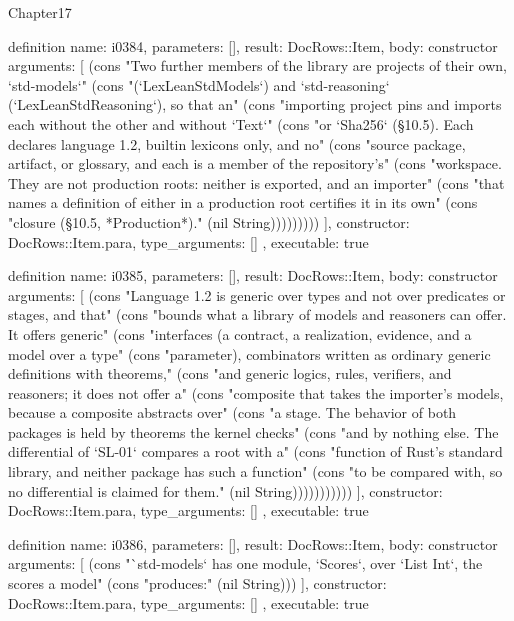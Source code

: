 \begin{lexlean}{Chapter17}
\begin{semanticmodule}
definition{
  name: i0384,
  parameters: [],
  result: DocRows::Item,
  body: constructor{
    arguments: [
      (cons "Two further members of the library are projects of their own, `std-models`" (cons "(`LexLeanStdModels`) and `std-reasoning` (`LexLeanStdReasoning`), so that an" (cons "importing project pins and imports each without the other and without `Text`" (cons "or `Sha256` (§10.5). Each declares language 1.2, builtin lexicons only, and no" (cons "source package, artifact, or glossary, and each is a member of the repository's" (cons "workspace. They are not production roots: neither is exported, and an importer" (cons "that names a definition of either in a production root certifies it in its own" (cons "closure (§10.5, *Production*)." (nil String)))))))))
    ],
    constructor: DocRows::Item.para,
    type_arguments: []
  },
  executable: true
}

definition{
  name: i0385,
  parameters: [],
  result: DocRows::Item,
  body: constructor{
    arguments: [
      (cons "Language 1.2 is generic over types and not over predicates or stages, and that" (cons "bounds what a library of models and reasoners can offer. It offers generic" (cons "interfaces (a contract, a realization, evidence, and a model over a type" (cons "parameter), combinators written as ordinary generic definitions with theorems," (cons "and generic logics, rules, verifiers, and reasoners; it does not offer a" (cons "composite that takes the importer's models, because a composite abstracts over" (cons "a stage. The behavior of both packages is held by theorems the kernel checks" (cons "and by nothing else. The differential of `SL-01` compares a root with a" (cons "function of Rust's standard library, and neither package has such a function" (cons "to be compared with, so no differential is claimed for them." (nil String)))))))))))
    ],
    constructor: DocRows::Item.para,
    type_arguments: []
  },
  executable: true
}

definition{
  name: i0386,
  parameters: [],
  result: DocRows::Item,
  body: constructor{
    arguments: [
      (cons "`std-models` has one module, `Scores`, over `List Int`, the scores a model" (cons "produces:" (nil String)))
    ],
    constructor: DocRows::Item.para,
    type_arguments: []
  },
  executable: true
}


\end{semanticmodule}
\end{lexlean}
